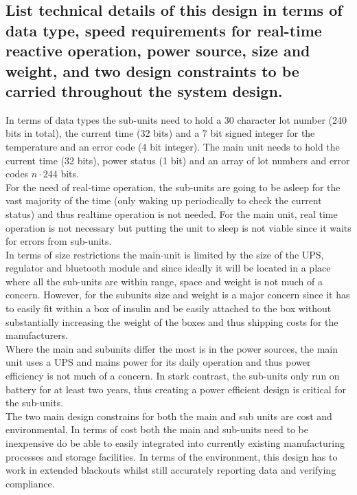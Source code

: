 \documentclass[12pt]{article} \usepackage{jeep} \usepackage{unicode}
\begin{document}
\subsection{List technical details of this design in terms of data type, speed
  requirements for real-time reactive operation, power source, size and weight,
  and two design constraints to be carried throughout the system design.}
In terms of data types the sub-units need to hold a 30 character lot number (240
bits in total), the current time (32 bits) and a 7 bit signed integer for the
temperature and an error code (4 bit integer). The main unit needs to hold the
current time (32 bits), power status (1 bit) and an array of lot numbers and
error codes $n\cdot244$ bits.\vspace{\baselineskip} \\
For the need of real-time operation, the sub-units are going to be asleep for the vast majority of the time (only waking up periodically to check the current status) and thus realtime operation is not needed. For the main unit, real time operation is not necessary but putting the unit to sleep is not viable since it waits for errors from sub-units.\vspace{\baselineskip}\\
In terms of size restrictions the main-unit is limited by the size of the UPS,
regulator and bluetooth module and since ideally it will be located in a place
where all the sub-units are within range, space and weight is not much of a
concern. However, for the subunits size and weight is a major concern since it
has to easily fit within a box of insulin and be easily attached to the box
without substantially increasing the weight of the boxes and thus shipping costs
for the manufacturers.\vspace{\baselineskip}\\
Where the main and subunits differ the most is in the power sources, the main unit uses a UPS and mains power for its daily operation and thus power efficiency is not much of a concern. In stark contrast, the sub-units only run on battery for at least two years, thus creating a power efficient design is critical for the sub-units.\\
The two main design constrains for both the main and sub units are cost and
environmental. In terms of cost both the main and sub-units need to be
inexpensive do be able to easily integrated into currently existing
manufacturing processes and storage facilities. In terms of the environment,
this design has to work in extended blackouts whilst still accurately reporting
data and verifying compliance.
\end{document}
